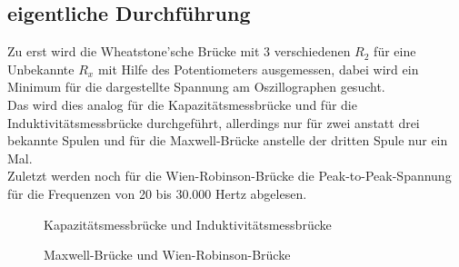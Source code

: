 \subsection{eigentliche Durchführung}
Zu erst wird die Wheatstone'sche Brücke mit 3 verschiedenen $R_2$ für eine Unbekannte $R_x$ mit Hilfe des Potentiometers ausgemessen, dabei wird ein Minimum für die dargestellte Spannung am Oszillographen gesucht. \\
Das wird dies analog für die Kapazitätsmessbrücke und für die Induktivitätsmessbrücke durchgeführt, allerdings nur für zwei anstatt drei bekannte Spulen und für die Maxwell-Brücke anstelle der dritten Spule nur ein Mal. \\
Zuletzt werden noch für die Wien-Robinson-Brücke die Peak-to-Peak-Spannung für die Frequenzen von 20 bis 30.000 Hertz abgelesen.
\begin{figure}[h]
\centering
\hfill
{}
\hfill
{}
\hfill
\caption{Kapazitätsmessbrücke und Induktivitätsmessbrücke}
\label{Gesamtbild1}
\end{figure}
\begin{figure}[h]
\centering
\hfill
{}
\hfill
{}
\hfill
\caption{Maxwell-Brücke und Wien-Robinson-Brücke}
\label{Gesamtbild2}
\end{figure}
